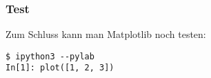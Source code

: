 \subsubsection{Test}
Zum Schluss kann man Matplotlib noch testen:
\begin{verbatim}
$ ipython3 --pylab
In[1]: plot([1, 2, 3])
\end{verbatim}
